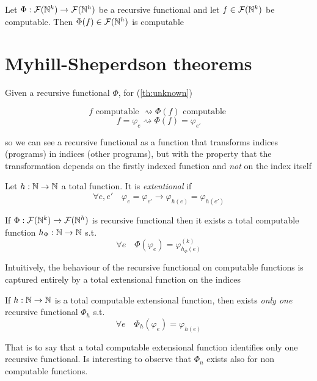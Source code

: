 \begin{theorem}\label{th:unknown}
  Let $\Phi : \mathcal{F}(\mathbb{N}^k) \to \mathcal{F}(\mathbb{N}^h)$
  be a recursive functional and let $f \in \mathcal{F}(\mathbb{N}^k)$ be
  computable. Then $\Phi(f) \in \mathcal{F}(\mathbb{N}^h)$ is computable
\end{theorem}

\section{Myhill-Sheperdson theorems}
Given a recursive functional $\Phi$, for (\ref{th:unknown})

\[
  f \mbox{ computable } \rightsquigarrow \Phi(f) \mbox{ computable }
\]
\[
  f = \varphi_e \rightsquigarrow \Phi(f) = \varphi_{e'}
\]

so we can see a recursive functional as a function that transforms
indices (programs) in indices (other programs), but with the property
that the transformation depends on the firstly indexed function and
\emph{not} on the index itself

\begin{definition}
  Let $h : \mathbb{N} \to \mathbb{N}$ a total function. It is \emph{extentional} if
  \[
    \forall e,e' \quad \varphi_e = \varphi_{e'} \to
    \varphi_{h(e)} = \varphi_{h(e')}
  \]
\end{definition}

\begin{theorem}
  If $\Phi : \mathcal{F}(\mathbb{N}^k) \to \mathcal{F}(\mathbb{N}^h)$ is
  recursive functional then it exists a total computable function
  $h_\Phi : \mathbb{N} \to \mathbb{N}$ s.t.
  \[
    \forall e \quad \Phi(\varphi_e) = \varphi_{h_\Phi(e)}^{(k)}
  \]
\end{theorem}

Intuitively, the behaviour of the recursive functional on computable
functions is captured entirely by a total extensional function on the
indices

\begin{theorem}\label{th:myhill-shepherdson2}
  If $h : \mathbb{N} \to \mathbb{N}$ is a total computable extensional function, then
  exists \emph{only one} recursive functional $\Phi_h$ s.t.
  \[
    \forall e \quad \Phi_h(\varphi_e) = \varphi_{h(e)}
  \]
\end{theorem}
That is to say that a total computable extensional function identifies
only one recursive functional.  Is interesting to observe that
$\Phi_n$ exists also for non computable functions.

